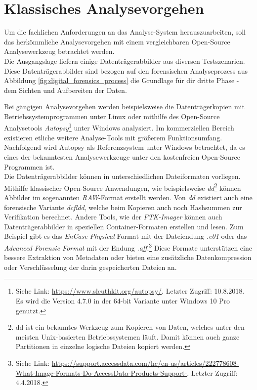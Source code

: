 \section{Klassisches Analysevorgehen}
\label{sec:common_analysis_approach_part1}
Um die fachlichen Anforderungen an das Analyse-System herauszuarbeiten, soll das herkömmliche Analysevorgehen mit einem vergleichbaren Open-Source Analysewerkzeug betrachtet werden.\\
Die Ausgangslage liefern einige Datenträgerabbilder aus diversen Testszenarien. Diese Datenträgerabbilder sind bezogen auf den forensischen Analyseprozess aus Abbildung \ref{fig:digital_forensics_process} die Grundlage für dir dritte Phase - dem Sichten und Aufbereiten der Daten.

\noindent
Bei gängigen Analysevorgehen werden beispielsweise die Datenträgerkopien mit Betriebssystemprogrammen unter Linux oder mithilfe des Open-Source Analysetools \textit{Autopsy}\footnote{Siehe Link: \url{https://www.sleuthkit.org/autopsy/}. Letzter Zugriff: 10.8.2018. Es wird die Version 4.7.0 in der 64-bit Variante unter Windows 10 Pro genutzt.} unter Windows analysiert. Im kommerziellen Bereich existieren etliche weitere Analyse-Tools mit größerem Funktionsumfang. Nachfolgend wird Autopsy als Referenzsystem unter Windows betrachtet, da es eines der bekanntesten Analysewerkzeuge unter den kostenfreien Open-Source Programmen ist. \\ 

\noindent
Die Datenträgerabbilder können in unterschiedlichen Dateiformaten vorliegen. Mithilfe klassischer Open-Source Anwendungen, wie beispielsweise \textit{dd}\footnote{dd ist ein bekanntes Werkzeug zum Kopieren von Daten, welches unter den meisten Unix-basierten Betriebssystemen läuft. Damit können auch ganze Partitionen in einzelne logische Dateien kopiert werden.} können Abbilder im sogenannten \textit{RAW}-Format erstellt werden. Von \textit{dd} existiert auch eine forensische Variante \textit{dcfldd}, welche beim Kopieren auch noch Hashsummen zur Verifikation berechnet.\cite{linux_forensics}  Andere Tools, wie der \textit{FTK-Imager} können auch Datenträgerabbilder in speziellen Container-Formaten erstellen und lesen. Zum Beispiel gibt es das \textit{EnCase Physical}-Format mit der Dateiendung \textit{.\acrshort{e01}} oder das \textit{Advanced Forensic Format} mit der Endung \textit{.\acrshort{aff}}.\footnote{Siehe Link: \url{https://support.accessdata.com/hc/en-us/articles/222778608-What-Image-Formats-Do-AccessData-Products-Support-}. Letzter Zugriff: 4.4.2018.} Diese Formate unterstützen eine bessere Extraktion von Metadaten oder bieten eine zusätzliche Datenkompression oder Verschlüsselung der darin gespeicherten Dateien an.\cite[S. 35]{digital_forensics}\\

